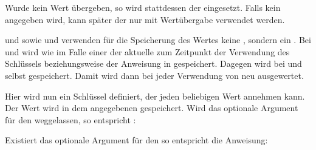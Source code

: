 Wurde kein Wert übergeben, so wird
stattdessen der  eingesetzt. Falls kein 
angegeben wird, kann später der  nur mit Wertübergabe
verwendet werden.

 und  sowie
 und  verwenden für
die Speicherung des Wertes keine , sondern ein . Bei
 und  wird wie im
Falle einer  der aktuelle  zum Zeitpunkt der
Verwendung des Schlüssels beziehungsweise der Anweisung in 
gespeichert. Dagegen wird bei
 und
  selbst gespeichert. Damit wird
 dann bei jeder Verwendung von  neu ausgewertet.%
\EndIndexGroup


\begin{Declaration}
\end{Declaration}
Hier wird nun ein Schlüssel definiert, der
jeden beliebigen Wert annehmen kann. Der Wert wird in dem angegebenen
 gespeichert. Wird das optionale Argument für den
 weggelassen, so entspricht :
Existiert
das optionale Argument für den  so entspricht die Anweisung:

